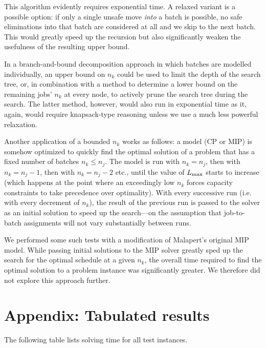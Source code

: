 \documentclass[13pt, letterpaper, oneside]{book}
\begin{document}
This algorithm evidently requires exponential time. A relaxed variant is a
possible option: if only a single unsafe move \textit{into} a batch is possible,
no safe eliminations into that batch are considered at all and we skip to the
next batch. This would greatly speed up the recursion but also significantly
weaken the usefulness of the resulting upper bound.

In a branch-and-bound decomposition approach in which batches are modelled
individually, an upper bound on $n_k$ could be used to limit the depth of the
search tree, or, in combination with a method to determine a lower bound on the
remaining jobs' $n_k$ at every node, to actively prune the search tree during
the search. The latter method, however, would also run in exponential time as
it, again, would require knapsack-type reasoning unless we use a much less powerful
relaxation.

Another application of a bounded $n_k$ works as follows: a model (CP or MIP) is
somehow optimized to quickly find the optimal solution of a problem that has a
fixed number of batches $n_k \leq n_j$. The model is run with $n_k = n_j$, then
with $n_k = n_j - 1$, then with $n_k = n_j - 2$ etc., until the value of $L_{\text{max}}$
starts to increase (which happens at the point where an exceedingly low $n_k$
forces capacity constraints to take precedence over optimality). With every
successive run (i.e. with every decrement of $n_k$), the result of the previous
run is passed to the solver as an initial solution to speed up the search---on
the assumption that job-to-batch assignments will not vary substantially between
runs.

We performed some such tests with a modification of Malapert's original MIP
model. While passing initial solutions to the MIP solver greatly sped up the
search for the optimal schedule at a given $n_k$, the overall time required to
find the optimal solution to a problem instance was significantly greater. We
therefore did not explore this approach further.

\chapter{Appendix: Tabulated results}
\label{appendix:results}
The following table lists solving time for all test instances.
\end{document}
